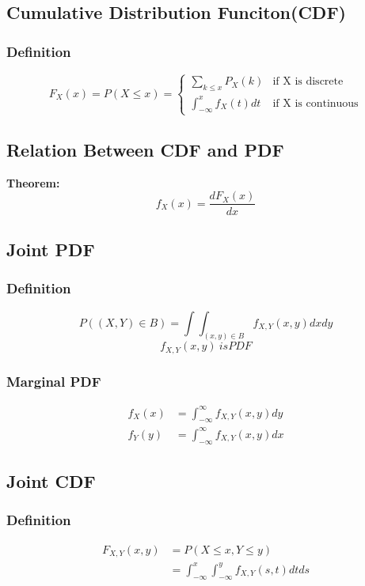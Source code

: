 \documentclass[11pt]{article}
\begin{document}
\subsection{Cumulative Distribution Funciton(CDF)}
\subsubsection{Definition}
\begin{equation*}
    F_X(x) = P(X\leq x) =
    \begin{cases}
        \underset{{k\leq x}}{\sum} P_X(k) & \text{if X is discrete}\\
        \int_{-\infty}^{x} f_X(t)dt & \text{if X is continuous}
    \end{cases}
\end{equation*}

\subsection{Relation Between CDF and PDF}
\noindent \textbf{Theorem:}\\
$$f_X(x)  = \frac{dF_X(x)}{dx}$$

\subsection{Joint PDF}
\subsubsection{Definition}
$$P((X,Y)\in B) = \int\int_{(x,y)\in B} f_{X,Y}(x,y) dxdy$$
$$f_{X,Y}(x,y)\ is PDF$$

\subsubsection{Marginal PDF}
\begin{equation*}
    \begin{split}
        f_X(x) & = \int_{-\infty}^{\infty} f_{X,Y}(x,y)dy\\
        f_Y(y) & = \int_{-\infty}^{\infty} f_{X,Y}(x,y)dx
    \end{split}
\end{equation*}

\subsection{Joint CDF}
\subsubsection{Definition}
\begin{equation*}
    \begin{split}
        F_{X,Y}(x,y) & = P(X\leq x, Y\leq y)\\
        & = \int_{-\infty}^{x}\int_{-\infty}^{y} f_{X,Y}(s,t)dtds
    \end{split}
\end{equation*}
\end{document}
